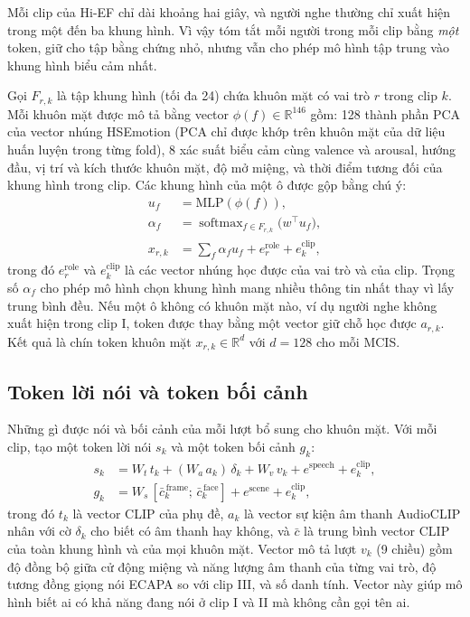 Mỗi clip của Hi-EF chỉ dài khoảng hai giây, và người nghe thường chỉ xuất hiện trong một đến ba khung hình. Vì vậy \model{} tóm tắt mỗi người trong mỗi clip bằng \emph{một} token, giữ cho tập bằng chứng nhỏ, nhưng vẫn cho phép mô hình tập trung vào khung hình biểu cảm nhất.

Gọi $F_{r,k}$ là tập khung hình (tối đa 24) chứa khuôn mặt có vai trò $r$ trong clip $k$. Mỗi khuôn mặt được mô tả bằng vector $\phi(f) \in \mathbb{R}^{146}$ gồm: 128 thành phần PCA của vector nhúng HSEmotion (PCA chỉ được khớp trên khuôn mặt của dữ liệu huấn luyện trong từng fold), 8 xác suất biểu cảm cùng valence và arousal, hướng đầu, vị trí và kích thước khuôn mặt, độ mở miệng, và thời điểm tương đối của khung hình trong clip. Các khung hình của một ô được gộp bằng chú ý:
\begin{equation}
\begin{split}
u_f &= \mathrm{MLP}(\phi(f)),\\
\alpha_f &= \operatorname{softmax}_{f \in F_{r,k}}\big(w^\top u_f\big),\\
x_{r,k} &= \textstyle\sum_{f} \alpha_f u_f + e^{\text{role}}_r + e^{\text{clip}}_k ,
\end{split}
\label{eq:pool}
\end{equation}
trong đó $e^{\text{role}}_r$ và $e^{\text{clip}}_k$ là các vector nhúng học được của vai trò và của clip. Trọng số $\alpha_f$ cho phép mô hình chọn khung hình mang nhiều thông tin nhất thay vì lấy trung bình đều. Nếu một ô không có khuôn mặt nào, ví dụ người nghe không xuất hiện trong clip I, token được thay bằng một vector giữ chỗ học được $a_{r,k}$. Kết quả là chín token khuôn mặt $x_{r,k} \in \mathbb{R}^d$ với $d = 128$ cho mỗi MCIS.

\subsection{Token lời nói và token bối cảnh}

Những gì được nói và bối cảnh của mỗi lượt bổ sung cho khuôn mặt. Với mỗi clip, \model{} tạo một token lời nói $s_k$ và một token bối cảnh $g_k$:
\begin{align}
s_k &= W_t\,t_k + (W_a\,a_k)\,\delta_k + W_v\,v_k + e^{\text{speech}} + e^{\text{clip}}_k, \label{eq:sk}\\
g_k &= W_s\,[\bar c^{\,\text{frame}}_k;\,\bar c^{\,\text{face}}_k] + e^{\text{scene}} + e^{\text{clip}}_k, \label{eq:gk}
\end{align}
trong đó $t_k$ là vector CLIP của phụ đề, $a_k$ là vector sự kiện âm thanh AudioCLIP nhân với cờ $\delta_k$ cho biết có âm thanh hay không, và $\bar c$ là trung bình vector CLIP của toàn khung hình và của mọi khuôn mặt. Vector mô tả lượt $v_k$ (9 chiều) gồm độ đồng bộ giữa cử động miệng và năng lượng âm thanh của từng vai trò, độ tương đồng giọng nói ECAPA so với clip III, và số danh tính. Vector này giúp mô hình biết ai có khả năng đang nói ở clip I và II mà không cần gọi tên ai.

